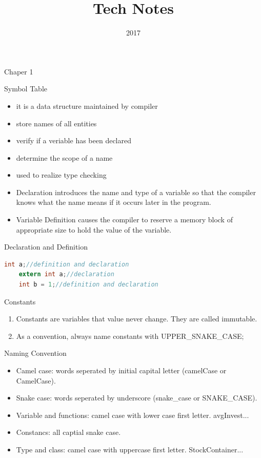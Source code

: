 \documentclass[a4paper]{tufte-handout}
\title{Tech Notes}
\date{2017}
\begin{document}
\maketitle

Chaper 1
\begin{note}
  Symbol Table
  \begin{itemize}
  \item it is a data structure maintained by compiler
  \item store names of all entities
  \item verify if a veriable has been declared
  \item determine the scope of a name
  \item used to realize type checking
  \end{itemize}

  \begin{itemize}
  \item Declaration introduces the name and type of a variable so that the compiler knows what the name means if it occurs later in the program.
  \item Variable Definition causes the compiler to reserve a memory block of appropriate size to hold the value of the variable.
  \end{itemize}

  Declaration and Definition
  \begin{lstlisting}[language=C]
    int a;//definition and declaration
    extern int a;//declaration
    int b = 1;//definition and declaration
  \end{lstlisting}
\end{note}

Constants
\begin{enumerate}
\item Constants are variables that value never change. They are called immutable.
\item As a convention, always name constants with UPPER\_SNAKE\_CASE;
\end{enumerate}

Naming Convention
\begin{itemize}
\item Camel case: words seperated by initial capital letter (camelCase or CamelCase).
\item Snake case: words seperated by underscore (snake\_case or SNAKE\_CASE).
\item Variable and functions: camel case with lower case first letter. avgInvest...
\item Constancs: all captial snake case.
\item Type and class: camel case with uppercase first letter. StockContainer...
\end{itemize}
\end{document}
